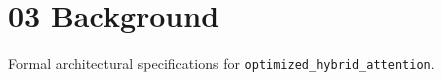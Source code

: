 \section{03 Background}

Formal architectural specifications for \texttt{optimized_hybrid_attention}.
